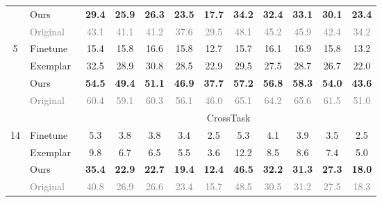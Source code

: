 \begin{table}[!ht]
{\begin{tabular}{clcccccccccc}
 &  \cellcolor{gray!30}Ours & \cellcolor{gray!30}\textbf{29.4} & \cellcolor{gray!30}\textbf{25.9} & \cellcolor{gray!30}\textbf{26.3} & \cellcolor{gray!30}\textbf{23.5} & \cellcolor{gray!30}\textbf{17.7} & \cellcolor{gray!30}\textbf{34.2} & \cellcolor{gray!30}\textbf{32.4} & \cellcolor{gray!30}\textbf{33.1} & \cellcolor{gray!30}\textbf{30.1} & \cellcolor{gray!30}\textbf{23.4} \\
 & \textcolor{gray}{Original} & \textcolor{gray}{43.1} & \textcolor{gray}{41.1} & \textcolor{gray}{41.2} & \textcolor{gray}{37.6} & \textcolor{gray}{29.5} & \textcolor{gray}{48.1} & \textcolor{gray}{45.2} & \textcolor{gray}{45.9} & \textcolor{gray}{42.4} & \textcolor{gray}{34.2} \\ \midrule
\multirow{4}{*}{5} & Finetune & 15.4 & 15.8 & 16.6 & 15.8 & 12.7 & 15.7 & 16.1 & 16.9 & 15.8 & 13.2 \\
 & Exemplar~\cite{alssum2023just} & 32.5 & 28.9 & 30.8 & 28.5 & 22.9 & 29.5 & 27.5 & 28.7 & 26.7 & 22.0 \\
 & \cellcolor{gray!30}Ours & \cellcolor{gray!30}\textbf{54.5} & \cellcolor{gray!30}\textbf{49.4} & \cellcolor{gray!30}\textbf{51.1} & \cellcolor{gray!30}\textbf{46.9} & \cellcolor{gray!30}\textbf{37.7} & \cellcolor{gray!30}\textbf{57.2} & \cellcolor{gray!30}\textbf{56.8} & \cellcolor{gray!30}\textbf{58.3} & \cellcolor{gray!30}\textbf{54.0} & \cellcolor{gray!30}\textbf{43.6} \\
 & \textcolor{gray}{Original} & \textcolor{gray}{60.4} & \textcolor{gray}{59.1} & \textcolor{gray}{60.3} & \textcolor{gray}{56.1} & \textcolor{gray}{46.0} & \textcolor{gray}{65.1} & \textcolor{gray}{64.2} & \textcolor{gray}{65.6} & \textcolor{gray}{61.5} & \textcolor{gray}{51.0} \\ \midrule
&&\multicolumn{10}{c}{CrossTask}\\ \midrule
\multirow{4}{*}{14}& Finetune & 5.3 & 3.8	& 3.8 & 3.4 & 2.5 & 5.3 & 4.1 & 3.9 & 3.5 & 2.5 \\
& Exemplar~\cite{alssum2023just} & 9.8	& 6.7 & 6.5 & 5.5 & 3.6 & 12.2 & 8.5 & 8.6 & 7.4 & 5.0 \\
& \cellcolor{gray!30}Ours & \cellcolor{gray!30}\textbf{35.4} & \cellcolor{gray!30}\textbf{22.9} & \cellcolor{gray!30}\textbf{22.7} & \cellcolor{gray!30}\textbf{19.4} & \cellcolor{gray!30}\textbf{12.4} & \cellcolor{gray!30}\textbf{46.5} & \cellcolor{gray!30}\textbf{32.2} & \cellcolor{gray!30}\textbf{31.3} & \cellcolor{gray!30}\textbf{27.3} & \cellcolor{gray!30}\textbf{18.0} \\
&\textcolor{gray}{Original} & \textcolor{gray}{40.8} & \textcolor{gray}{26.9} & \textcolor{gray}{26.6} & \textcolor{gray}{23.4} & \textcolor{gray}{15.7} & \textcolor{gray}{48.5} & \textcolor{gray}{30.5} & \textcolor{gray}{31.2} & \textcolor{gray}{27.5} & \textcolor{gray}{18.3} \\ \midrule

\end{tabular}}
\end{table}
